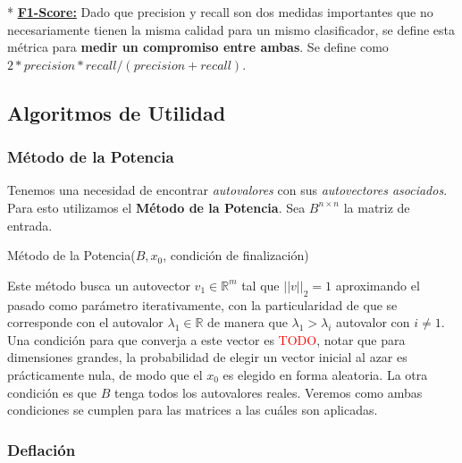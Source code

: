 * \underline{\textbf{F1-Score:}} Dado que precision y recall son dos medidas importantes que no necesariamente tienen la misma calidad para un mismo clasificador, se define esta m\'etrica para \textbf{medir un compromiso entre ambas}. Se define como $2 * precision * recall / (precision + recall)$.

\subsection{Algoritmos de Utilidad}

\subsubsection{M\'etodo de la Potencia}\label{desarrollo_metodo-potencia}

Tenemos una necesidad de encontrar \textit{autovalores} con sus \textit{autovectores asociados}. Para esto utilizamos el \textbf{M\'etodo de la Potencia}. Sea $B^{n \times n}$ la matriz de entrada.

\begin{algorithm}
\begin{algorithmic}[1]
\ENDWHILE
{}
\end{algorithmic}
\caption{M\'etodo de la Potencia($B, x_{0}$, condici\'on de finalizaci\'on)}
\end{algorithm}

Este m\'etodo busca un autovector $v_{1} \in \mathbb{R}^{m}$ tal que $\vert\vert v \vert\vert_{2} = 1$ aproximando el pasado como par\'ametro iterativamente, con la particularidad de que se corresponde con el autovalor $\lambda_{1} \in \mathbb{R}$ de manera que $\lambda_{1} > \lambda_{i}$ autovalor con $i \neq 1$. Una condici\'on para que converja a este vector es \textcolor{red}{TODO}, notar que para dimensiones grandes, la probabilidad de elegir un vector inicial al azar es pr\'acticamente nula, de modo que el $x_{0}$ es elegido en forma aleatoria. La otra condici\'on es que $B$ tenga todos los autovalores reales. Veremos como ambas condiciones se cumplen para las matrices a las cu\'ales son aplicadas.

\subsubsection{Deflaci\'on}\label{desarrollo_deflacion}

